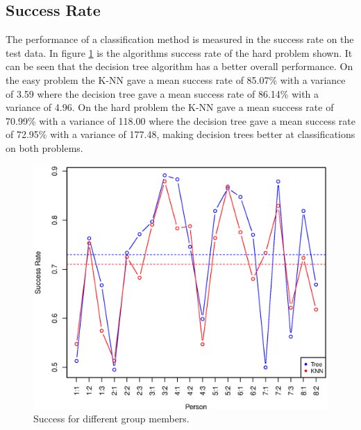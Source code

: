 \subsection{Success Rate}
The performance of a classification method is measured in the success rate on the test data.
In figure \ref{fig:success_comparison_hard} is the algorithms success rate of the hard problem shown.
It can be seen that the decision tree algorithm has a better overall performance.
On the easy problem the K-NN gave a mean success rate of 
85.07\% with a variance of 3.59
where the decision tree gave a mean success rate of
86.14\% with a variance of 4.96. 
On the hard problem the K-NN gave a mean success rate of 
70.99\% with a variance of 118.00
where the decision tree gave a mean success rate of
72.95\% with a variance of 177.48, 
making decision trees better at classifications on both problems.

\begin{figure}[H]
\centering
\includegraphics[width=\textwidth]{graphics/success_comp_hard}
\caption{Success for different group members.}
\label{fig:success_comparison_hard}
\end{figure}

